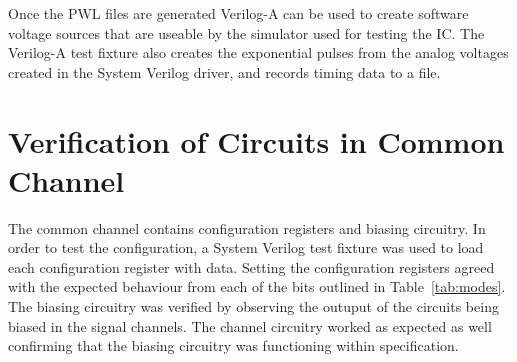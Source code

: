 \documentclass[12pt,oneside,final]{siuethesis}
\theoremstyle{definition}
\begin{document}


\par Once the PWL files are generated Verilog-A can be used to create software voltage sources that are useable by the simulator used for testing the IC. The Verilog-A test fixture also creates the exponential pulses from the analog voltages created in the System Verilog driver, and records timing data to a file. 

\section{Verification of Circuits in Common Channel}
\par The common channel contains configuration registers and biasing circuitry. In order to test the configuration, a System Verilog test fixture was used to load each configuration register with data. Setting the configuration registers agreed with the expected behaviour from each of the bits outlined in Table~\ref{tab:modes}. The biasing circuitry was verified by observing the outuput of the circuits being biased in the signal channels. The channel circuitry worked as expected as well confirming that the biasing circuitry was functioning within specification.
\end{document}
